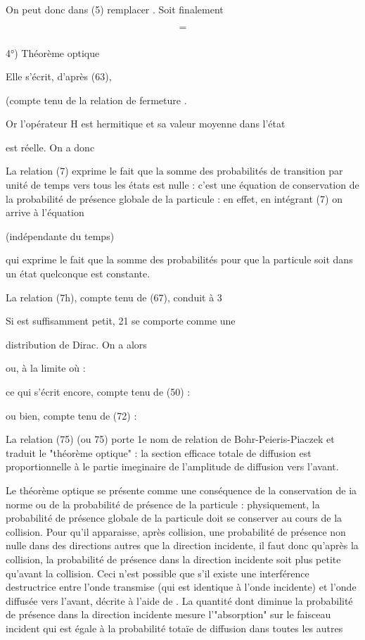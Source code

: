 On peut donc dans (5) remplacer . Soit finalement

\[
\tag{73}=
\]

\subsubsection{}%
4°) Théorème optique

Elle s'écrit, d'après (63),

(compte tenu de la relation de fermeture .

Or l'opérateur H est hermitique et sa valeur moyenne dans l'état 

est réelle. On a donc

La relation (7) exprime le fait que la somme des probabilités
de transition par unité de temps vers tous les états  est nulle :
c'est une équation de conservation de la probabilité de présence globale
de la particule : en effet, en intégrant (7) on arrive à l'équation

 (indépendante du temps)

qui exprime le fait que la somme des probabilités pour que la particule
soit dans un état  quelconque est constante.

La relation (7h), compte tenu de (67), conduit à 3

Si  est suffisamment petit, 21 se comporte comme une

distribution de Dirac. On a alors


ou, à la limite où  :

ce qui s'écrit encore, compte tenu de (50) :

ou bien, compte tenu de (72) :

La relation (75) (ou 75) porte 1e nom de relation de
Bohr-Peieris-Piaczek et traduit le "théorème optique" : la section
efficace totale de diffusion est proportionnelle à le partie imeginaire de
l'amplitude de diffusion vers l'avant.

Le théorème optique se présente comme une conséquence
de la conservation de ia norme ou de la probabilité de présence de la
particule : physiquement, la probabilité de présence globale de la particule
doit se conserver au cours de la collision. Pour qu'il apparaisse,
après collision, une probabilité de présence non nulle dans des directions
autres que la direction incidente, il faut donc qu'après la collision, la
probabilité de présence dans la direction incidente soit plus petite
qu'avant la collision. Ceci n'est possible que s'il existe une interférence
destructrice entre l'onde transmise (qui est identique à l'onde
incidente) et l'onde diffusée vers l'avant, décrite à l'aide de
. La quantité dont diminue la probabilité de présence dans la
direction incidente mesure l'"absorption" sur le faisceau incident qui
est égale à la probabilité totaïe de diffusion dans toutes les autres

